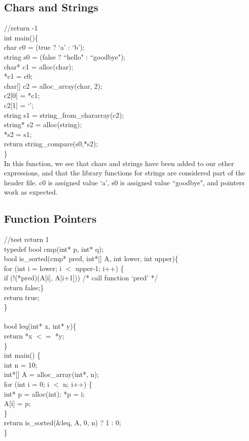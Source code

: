 \documentclass{article}
\begin{document}
\subsection{Chars and Strings}
//return -1\\
int main()\{\\
  char c0 = (true ? `a' : `b');\\
  string s0 = (false ? ``hello" : ``goodbye");\\
  char* c1 = alloc(char);\\
  *c1 = c0;\\
  char[] c2 = alloc\_array(char, 2);\\
  c2[0] = *c1;\\
  c2[1] = `\0';\\
  string s1 = string\_from\_chararray(c2);\\
  string* s2 = alloc(string);\\
  *s2 = s1;\\
  return string\_compare(s0,*s2);\\
\}\\

In this function, we see that chars and strings have been added to our other expressions, and that the library functions for strings are considered part of the header file. c0 is assigned value `a', s0 is assigned value ``goodbye", and pointers work as expected.

\subsection{Function Pointers}
//test return 1\\
typedef bool cmp(int* p, int* q);\\
bool is\_sorted(cmp* pred, int*[] A, int lower, int upper)\{\\
  for (int i = lower; i $<$ upper-1; i++) \{\\
    if (!(*pred)(A[i], A[i+1])) /* call function `pred’ */\\
      return false;\}\\
  return true;\\
\}\\
\\
bool leq(int* x, int* y)\{\\
  return *x $<=$ *y;\\
\}
\\
int main() \{\\
  int n = 10;\\
  int*[] A = alloc\_array(int*, n);\\
  for (int i = 0; i $<$ n; i++) \{\\
     int* p = alloc(int); *p = i;\\
     A[i] = p;                \\
  \}\\
  return is\_sorted($\&$leq, A, 0, n) ? 1 : 0;\\
\}\\
\end{document}
